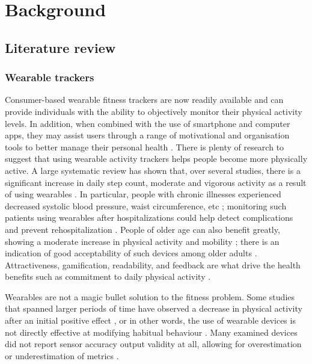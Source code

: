 \chapter{Background}
\label{cha:background}
\section{Literature review}
\subsection{Wearable trackers}
Consumer-based wearable fitness trackers are now readily available and can provide individuals with the ability to objectively monitor their physical activity levels. In addition, when combined with the use of smartphone and computer apps, they may assist users through a range of motivational and organisation tools to better manage their personal health \cite{trackersBenefitGeneral}.
There is plenty of research to suggest that using wearable activity trackers helps people become more physically active. A large systematic review has shown that, over several studies, there is a significant increase in daily step count, moderate and vigorous activity as a result of using wearables \cite{trackersBenefitGeneral}. In particular, people with chronic illnesses experienced decreased systolic blood pressure, waist circumference, etc \cite {Franssen2020}; monitoring such patients using wearables after hospitalizations could help detect complications and prevent rehospitalization \cite{hospi}. People of older age can also benefit greatly, showing a moderate increase in physical activity and mobility \cite{SOliveira1188}; there is an indication of good acceptability of such devices among older adults \cite {Franssen2020}. Attractiveness, gamification, readability, and feedback are what drive the health benefits such as commitment to daily physical activity \cite{NELSON2016364}. 

Wearables are not a magic bullet solution to the fitness problem. Some studies that spanned larger periods of time have observed a decrease in physical activity after an initial positive effect \cite{Finkelstein2016}, or in other words, the use of wearable devices is not directly effective at modifying habitual behaviour \cite{LI2021104487}. Many examined devices did not report sensor accuracy output validity at all, allowing for overestimation or underestimation of metrics \cite{Lee2014ActivityTA}.
